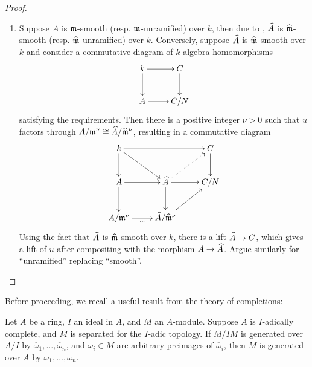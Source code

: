 \begin{proof}
\begin{enumerate}[label=(\arabic*)]
    \item Suppose $A$ is $\mathfrak{m}$-smooth (resp. $\mathfrak{m}$-unramified) over $k$, then due to , $\widehat{A}$ is $\widehat{\mathfrak{m}}$-smooth (resp. $\widehat{\mathfrak{m}}$-unramified) over $k$. Conversely, suppose $\widehat{A}$ is $\widehat{\mathfrak{m}}$-smooth over $k$ and consider a commutative diagram of $k$-algebra homomorphisms 
    \begin{equation*}
        \xymatrix {
            k\ar[r]\ar[d] & C\ar[d]\\
            A\ar[r] & C/N
        }
    \end{equation*}
    satisfying the requirements. Then there is a positive integer $\nu > 0$ such that $u$ factors through $A/\mathfrak{m}^\nu\cong\widehat{A}/\widehat{\mathfrak{m}}^\nu$, resulting in a commutative diagram 
    \begin{equation*}
        \xymatrix {
            k\ar[rr]\ar[d]\ar[rd] & & C\ar[d]\\
            A\ar[r]\ar[d] & \wh A\ar[r]\ar[d]\ar@{.>}[ru] & C/N\\
            A/\frakm^\nu\ar[r]_-{\sim} & \wh A/\wh\frakm^\nu\ar[ru] & 
        }
    \end{equation*}
    Using the fact that $\widehat{A}$ is $\widehat{\mathfrak{m}}$-smooth over $k$, there is a lift $\widehat{A}\to C$, which gives a lift of $u$ after compositing with the morphism $A\to\widehat{A}$. Argue similarly for ``unramified'' replacing ``smooth''. \qedhere
\end{enumerate}
\end{proof}

Before proceeding, we recall a useful result from the theory of completions: 
\begin{lemma}
    Let $A$ be a ring, $I$ an ideal in $A$, and $M$ an $A$-module. Suppose $A$ is $I$-adically complete, and $M$ is separated for the $I$-adic topology. If $M/IM$ is generated over $A/I$ by $\overline\omega_1,\dots,\overline\omega_n$, and $\omega_i\in M$ are arbitrary preimages of $\overline\omega_i$, then $M$ is generated over $A$ by $\omega_1,\dots,\omega_n$.
\end{lemma}

